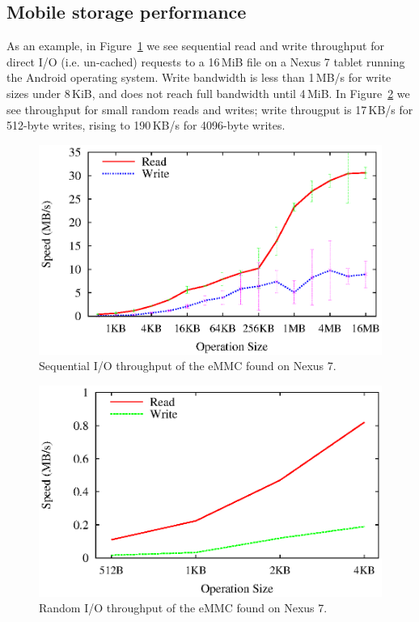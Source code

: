 \documentclass[letterpaper,twocolumn,10pt]{article}
\begin{document}
\subsection{Mobile storage performance}

As an example, in Figure~\ref{fig:seq-throughput} we see sequential read and
write throughput for direct I/O (i.e. un-cached) requests to a 16\,MiB file on a
Nexus 7 tablet running the Android operating system. Write bandwidth
is less than 1\,MB/s for write sizes under 8\,KiB, and does not reach
full bandwidth until 4\,MiB. In Figure~\ref{fig:rnd-throughput} we see
throughput for small random reads and writes; write througput is
17\,KB/s for 512-byte writes, rising to 190\,KB/s for 4096-byte
writes. 

\begin{figure}[t]
  \begin{center}
    \includegraphics[width=1.04\columnwidth]{graphs/seq-throughput}
  \end{center}
  \caption{Sequential I/O throughput of the eMMC found on Nexus 7.}
  \label{fig:seq-throughput}
\end{figure}

\begin{figure}[t]
  \begin{center}
    \includegraphics[width=1.04\columnwidth]{graphs/rnd-throughput}
  \end{center}
  \caption{Random I/O throughput of the eMMC found on Nexus 7.}
  \label{fig:rnd-throughput}
\end{figure}
\end{document}
